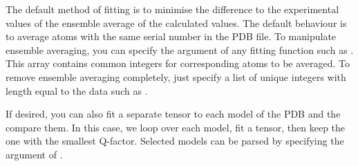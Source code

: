 \documentclass[a4paper,10pt,english]{sphinxmanual}
\begin{document}
The default method of fitting is to minimise the difference to the experimental values of the ensemble average of the calculated values. The default behaviour is to average atoms with the same serial number in the PDB file. To manipulate ensemble averaging, you can specify the  argument of any fitting function such as {\hyperref[\detokenize{reference/generated/paramagpy.fit.nlr_fit_metal_from_pcs:paramagpy.fit.nlr_fit_metal_from_pcs}]{}}. This array contains common integers for corresponding atoms to be averaged. To remove ensemble averaging completely, just specify a list of unique integers with length equal to the data such as .

%
\begin{sphinxVerbatim}[commandchars=\\\{\}]
  
    
	\PYG{p}{[}\PYG{p}{]}\PYG{p}{[}\PYG{p}{]}  
     \PYG{p}{[}\PYG{p}{]}
\PYG{p}{[}\PYG{p}{]}
\end{sphinxVerbatim}

If desired, you can also fit a separate tensor to each model of the PDB and the compare them. In this case, we loop over each model, fit a tensor, then keep the one with the smallest Q-factor. Selected models can be parsed by specifying the  argument of {\hyperref[\detokenize{reference/generated/paramagpy.protein.CustomStructure.parse:paramagpy.protein.CustomStructure.parse}]{}}.
\end{document}
